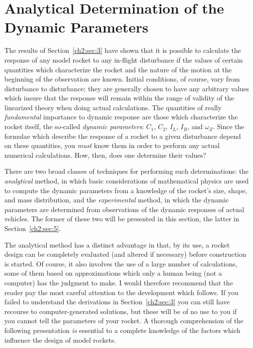 \section{Analytical Determination of the Dynamic Parameters}\label{ch2:sec:4}

The results of Section~\ref{ch2:sec:3} have shown that it is possible to
calculate the response of any model rocket to any in-flight disturbance if
the values of certain quantities which characterize the rocket and the nature
of the motion at the beginning of the observation are known. Initial
conditions, of course, vary from disturbance to disturbance; they are
generally chosen to have any arbitrary values which insure that the response
will remain within the range of validity of the linearized theory when doing
actual calculations. The quantities of really \emph{fundamental} importance
to dynamic response are those which characterize the rocket itself, the
so-called \emph{dynamic parameters}: $C_1$, $C_2$, $I_L$, $I_R$, and
$\omega_Z$. Since the formulae which describe the response of a rocket to a
given disturbance depend on these quantities, you \emph{must} know them in
order to perform any actual numerical calculations. How, then, does one
determine their values?

There are two broad classes of techniques for performing such
determinations: the \emph{analytical} method, in which basic considerations
of mathematical physics are used to compute the dynamic parameters from a
knowledge of the rocket's size, shape, and mass distribution, and the
\emph{experimental} method, in which the dynamic parameters are determined
from observations of the dynamic responses of actual vehicles. The former of
these two will be presented in this section, the latter in
Section~\ref{ch2:sec:5}.

The analytical method has a distinct advantage in that, by its use, a rocket
design can be completely evaluated (and altered if necessary) before
construction is started. Of course, it also involves the use of a large
number of calculations, some of them based on approximations which only a
human being (not a computer) has the judgment to make. I would therefore
recommend that the reader pay the most careful attention to the development
which follows. If you failed to understand the derivations in
Section~\ref{ch2:sec:3} you can still have recourse to computer-generated
solutions, but these will be of no use to you if you cannot tell the
parameters of your rocket. A thorough comprehension of the following
presentation \emph{is} essential to a complete knowledge of the factors
which influence the design of model rockets.

